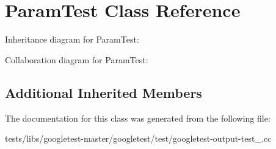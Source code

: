 \hypertarget{classParamTest}{}\section{Param\+Test Class Reference}
\label{classParamTest}


Inheritance diagram for Param\+Test\+:


Collaboration diagram for Param\+Test\+:
\subsection*{Additional Inherited Members}


The documentation for this class was generated from the following file\+:\begin{DoxyCompactItemize}
\item 
tests/libs/googletest-\/master/googletest/test/googletest-\/output-\/test\+\_\+.\+cc\end{DoxyCompactItemize}
